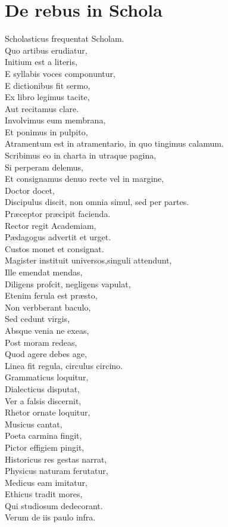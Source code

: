 \documentclass[12pt, twocolumn]{memoir}
\begin{document}
\chapter{De rebus in Schola}

Scholasticus frequentat Scholam.\\
Quo artibus erudiatur,\\
Initium est a literis,\\
E syllabis voces componuntur,\\
E dictionibus fit sermo,\\
Ex libro legimus tacite,\\
Aut recitamus clare.\\
Involvimus eum membrana,\\
Et ponimus in pulpito,\\
Atramentum est in atramentario, in quo tingimus calamum.\\
Scribimus eo in charta in utraque pagina,\\
Si perperam delemus,\\
Et consignamus denuo recte vel in margine,\\
Doctor docet,\\
Discipulus discit, non omnia simul, sed per partes.\\
Præceptor præcipit facienda.\\
Rector regit Academiam,\\
Pædagogus advertit et urget.\\
Custos monet et consignat.\\
Magister instituit universos,singuli attendunt,\\
Ille emendat mendas,\\
Diligens profcit, negligens vapulat,\\
Etenim ferula est præsto,\\
Non verbberant baculo,\\
Sed cedunt virgis,\\
Absque venia ne exeas,\\
Post moram redeas,\\
Quod agere debes age,\\
Linea fit regula, circulus circino.\\
Grammaticus loquitur,\\
Dialecticus disputat,\\
Ver a falsis discernit,\\
Rhetor ornate loquitur,\\
Musicus cantat,\\
Poeta carmina fingit,\\
Pictor effigiem pingit,\\
Historicus res gestas narrat,\\
Physicus naturam ferutatur,\\
Medicus eam imitatur,\\
Ethicus tradit mores,\\
Qui studiosum dedecorant.\\
Verum de iis paulo infra.\\
\end{document}
